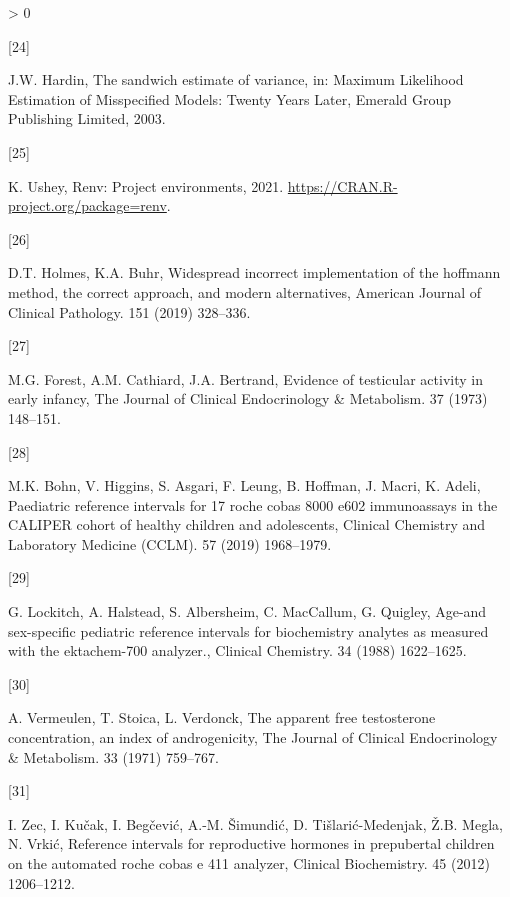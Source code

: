 \documentclass[]{elsarticle} %
\newlength{\csllabelwidth}
\newlength{\cslhangindent}
\newenvironment{CSLReferences}[3] %
 {%
  \setlength{\parindent}{0pt}
  \ifodd #1 \everypar{\setlength{\hangindent}{\cslhangindent}}\ignorespaces\fi
  \ifnum #2 > 0
  \setlength{\parskip}{#2\baselineskip}
  \fi
 }%
 {}
\newcommand{\CSLLeftMargin}[1]{\parbox[t]{\csllabelwidth}{#1}}
\newcommand{\CSLRightInline}[1]{\parbox[t]{\linewidth - \csllabelwidth}{#1}}
\begin{document}
\begin{CSLReferences}{0}{0}
\leavevmode\hypertarget{ref-hardin2003sandwich}{}%
\CSLLeftMargin{{[}24{]} }
\CSLRightInline{J.W. Hardin, The sandwich estimate of variance, in:
Maximum Likelihood Estimation of Misspecified Models: Twenty Years
Later, Emerald Group Publishing Limited, 2003.}

\leavevmode\hypertarget{ref-renvpackage}{}%
\CSLLeftMargin{{[}25{]} }
\CSLRightInline{K. Ushey, Renv: Project environments, 2021.
\url{https://CRAN.R-project.org/package=renv}.}

\leavevmode\hypertarget{ref-holmes2019widespread}{}%
\CSLLeftMargin{{[}26{]} }
\CSLRightInline{D.T. Holmes, K.A. Buhr, Widespread incorrect
implementation of the hoffmann method, the correct approach, and modern
alternatives, American Journal of Clinical Pathology. 151 (2019)
328--336.}

\leavevmode\hypertarget{ref-forest1973evidence}{}%
\CSLLeftMargin{{[}27{]} }
\CSLRightInline{M.G. Forest, A.M. Cathiard, J.A. Bertrand, Evidence of
testicular activity in early infancy, The Journal of Clinical
Endocrinology \& Metabolism. 37 (1973) 148--151.}

\leavevmode\hypertarget{ref-bohn2019paediatric}{}%
\CSLLeftMargin{{[}28{]} }
\CSLRightInline{M.K. Bohn, V. Higgins, S. Asgari, F. Leung, B. Hoffman,
J. Macri, K. Adeli, Paediatric reference intervals for 17 roche cobas
8000 e602 immunoassays in the CALIPER cohort of healthy children and
adolescents, Clinical Chemistry and Laboratory Medicine (CCLM). 57
(2019) 1968--1979.}

\leavevmode\hypertarget{ref-lockitch1988age}{}%
\CSLLeftMargin{{[}29{]} }
\CSLRightInline{G. Lockitch, A. Halstead, S. Albersheim, C. MacCallum,
G. Quigley, Age-and sex-specific pediatric reference intervals for
biochemistry analytes as measured with the ektachem-700 analyzer.,
Clinical Chemistry. 34 (1988) 1622--1625.}

\leavevmode\hypertarget{ref-vermeulen1971apparent}{}%
\CSLLeftMargin{{[}30{]} }
\CSLRightInline{A. Vermeulen, T. Stoica, L. Verdonck, The apparent free
testosterone concentration, an index of androgenicity, The Journal of
Clinical Endocrinology \& Metabolism. 33 (1971) 759--767.}

\leavevmode\hypertarget{ref-zec2012reference}{}%
\CSLLeftMargin{{[}31{]} }
\CSLRightInline{I. Zec, I. Kučak, I. Begčević, A.-M. Šimundić, D.
Tišlarić-Medenjak, Ž.B. Megla, N. Vrkić, Reference intervals for
reproductive hormones in prepubertal children on the automated roche
cobas e 411 analyzer, Clinical Biochemistry. 45 (2012) 1206--1212.}


\end{CSLReferences}
\end{document}
